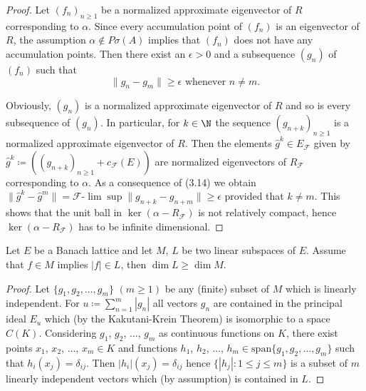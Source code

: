 	\begin{proof}
		Let $(f_{n})_{n\geq 1}$ be a normalized approximate eigenvector of $R$ corresponding to $\alpha$.
		Since every accumulation point of $(f_{n})$ is an eigenvector of $R$, the assumption $\alpha \notin P\sigma(A)$ implies that $(f_{n})$ does not have any accumulation points.
		Then there exist an $\epsilon > 0$ and a subsequence $(g_{n})$ of $(f_{n})$ such that
		\begin{equation}\label{eq:c3-3.14}
			\|g_{n} - g_{m}\| \geq \epsilon \text{ whenever } n \neq m.
		\end{equation}
		
		Obviously, $(g_{n})$ is a normalized approximate eigenvector of $R$ and so is every subsequence of $(g_{n})$.
		In particular, for $k \in \N$ the sequence $(g_{n+k})_{n\geq 1}$ is a normalized approximate eigenvector of $R$.
		Then the elements $\hat{g}^{k} \in E_{\mathcal{F}}$ given by $\hat{g}^{k} \coloneqq ((g_{n+k})_{n\geq 1} + c_{\mathcal{F}}(E))$ are normalized eigenvectors of $R_{\mathcal{F}}$ corresponding to $\alpha$.
		As a consequence of (3.14) we obtain
		$\|\hat{g}^{k} - \hat{g}^{m}\| = \mathcal{F}\text{-}\lim\sup\|g_{n+k} - g_{n+m}\| \geq \epsilon$ provided that $k \neq m$.
		This shows that the unit ball in $\ker(\alpha - R_{\mathcal{F}})$ is not relatively compact, hence $\ker(\alpha - R_{\mathcal{F}})$ has to be infinite dimensional.
	\end{proof}


\begin{lemma}\label{lem:c3-3.11}
	
	Let $E$ be a Banach lattice and let $M$, $L$ be two linear subspaces of $E$.
	Assume that $f \in M$ implies $|f| \in L$, then $\dim L \geq \dim M$.
\end{lemma}
	\begin{proof}
		Let $\{g_{1},g_{2},\ldots,g_{m}\}$ $(m\geq 1)$ be any (finite) subset of $M$ which is linearly independent.
		For $u \coloneqq \sum_{n=1}^{m}|g_{n}|$ all vectors $g_{n}$ are contained in the principal ideal $E_{u}$ which (by the Kakutani-Krein Theorem) is isomorphic to a space $C(K)$.
		Considering $g_{1}$, $g_{2}$, $\ldots$, $g_{m}$ as continuous functions on $K$, there exist points $x_{1}$, $x_{2}$, $\ldots$, $x_{m} \in K$ and functions $h_{1}$, $h_{2}$, $\ldots$, $h_{m} \in \mathrm{span}\{g_{1},g_{2},\ldots,g_{m}\}$ such that $h_{i}(x_{j}) = \delta_{ij}$.
		Then $|h_{i}|(x_{j}) = \delta_{ij}$ hence $\{|h_{j}| : 1\leq j\leq m\}$
%
		is a subset of $m$ linearly independent vectors which (by assumption) is contained in $L$.
	\end{proof}

